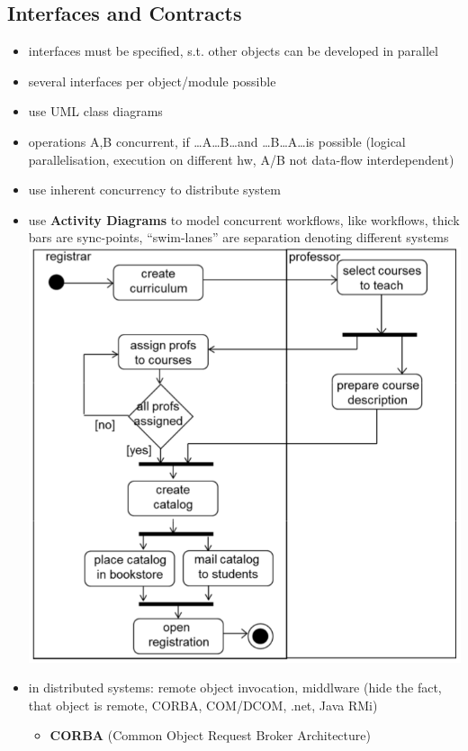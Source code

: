\documentclass[a4paper, 10pt]{article}
\begin{document}
\subsection{Interfaces and Contracts}
\begin{itemize}
	\item interfaces must be specified, s.t. other objects can be developed in parallel
	\item several interfaces per object/module possible
	\item use UML class diagrams
	\item operations A,B concurrent, if \dots A\dots B\dots and \dots B\dots A\dots is possible (logical parallelisation, execution on different hw, A/B not data-flow interdependent)
	\item use inherent concurrency to distribute system
	\item use \textbf{Activity Diagrams} to model concurrent workflows, like workflows, thick bars are sync-points, ``swim-lanes'' are separation denoting different systems \\
	\includegraphics[scale=0.4]{images/activity-diagram.png}
	\item in distributed systems: remote object invocation, middlware (hide the fact, that object is remote, CORBA, COM/DCOM, .net, Java RMi)
	\begin{itemize}
		\item \textbf{CORBA} (Common Object Request Broker Architecture)

\end{itemize}
\end{itemize}
\end{document}
